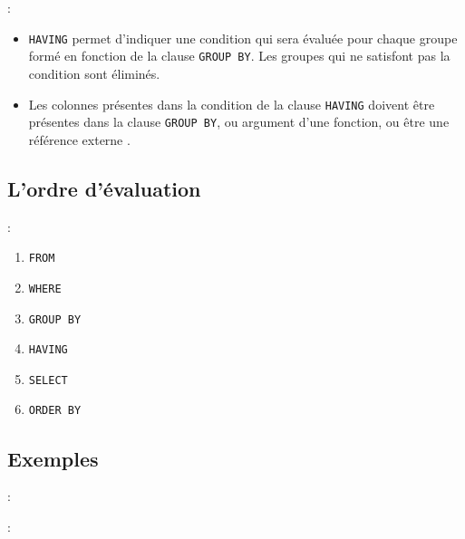 \documentclass[10pt]{beamer}
\begin{document}
\begin{frame}{\secname : \subsecname}
    \begin{itemize}
        \item \lstinline[language=plsql]!HAVING! permet d'indiquer une condition qui sera évaluée pour chaque groupe formé en fonction de la clause \lstinline[language=plsql]!GROUP BY!. Les groupes qui ne satisfont pas la condition sont éliminés.
        \item Les colonnes présentes dans la condition de la clause \lstinline[language=plsql]!HAVING! doivent être présentes dans la clause \lstinline[language=plsql]!GROUP BY!,  ou  argument d'une fonction,  ou être une référence externe .
    \end{itemize}
\end{frame}
\subsection{L'ordre d'évaluation}
\begin{frame}{\secname : \subsecname}
    \begin{enumerate}
        \item \lstinline[language=plsql]!FROM!
        \item \lstinline[language=plsql]!WHERE!
        \item \lstinline[language=plsql]!GROUP BY!
        \item \lstinline[language=plsql]!HAVING!
        \item \lstinline[language=plsql]!SELECT!
        \item \lstinline[language=plsql]!ORDER BY!
    \end{enumerate}
\end{frame}
\subsection{Exemples}
\begin{frame}{\secname : \subsecname}
    
\end{frame}

\begin{frame}{\secname : \subsecname}
    
\end{frame}
\end{document}
